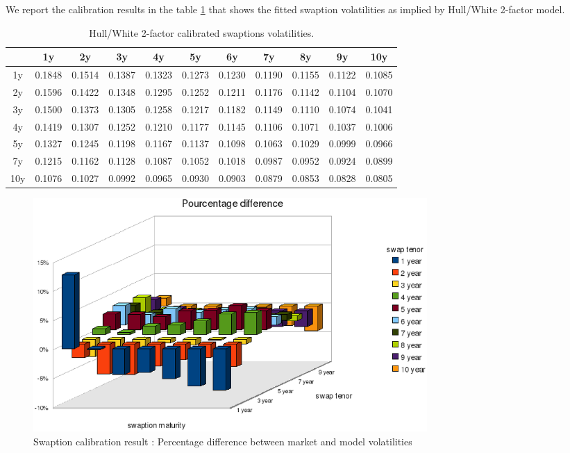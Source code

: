 \documentclass[12pt,a4paper]{article}
\begin{document}
We report the calibration results in the table \ref{''swaption res 1''} that shows the fitted swaption volatilities as implied by Hull/White 2-factor model.
\begin{table}[''h'']
   \centering
    \begin{tabular}{|c|c|c|c|c|c|c|c|c|c|c|}
    \hline
       & 1y & 2y & 3y & 4y & 5y & 6y & 7y & 8y & 9y & 10y\\
    \hline
1y & 0.1848 & 0.1514 & 0.1387 & 0.1323 & 0.1273 & 0.1230 & 0.1190 & 0.1155 & 0.1122 & 0.1085 \\
2y & 0.1596 & 0.1422 & 0.1348 & 0.1295 & 0.1252 & 0.1211 & 0.1176 & 0.1142 & 0.1104 & 0.1070 \\
3y & 0.1500 & 0.1373 & 0.1305 & 0.1258 & 0.1217 & 0.1182 & 0.1149 & 0.1110 & 0.1074 & 0.1041 \\
4y & 0.1419 & 0.1307 & 0.1252 & 0.1210 & 0.1177 & 0.1145 & 0.1106 & 0.1071 & 0.1037 & 0.1006 \\
5y & 0.1327 & 0.1245 & 0.1198 & 0.1167 & 0.1137 & 0.1098 & 0.1063 & 0.1029 & 0.0999 & 0.0966 \\
7y & 0.1215 & 0.1162 & 0.1128 & 0.1087 & 0.1052 & 0.1018 & 0.0987 & 0.0952 & 0.0924 & 0.0899 \\
10y & 0.1076 & 0.1027 & 0.0992 & 0.0965 & 0.0930 & 0.0903 & 0.0879 & 0.0853 & 0.0828 & 0.0805 \\
    \hline
\end{tabular}
\caption{\label{''swaption res 1''} Hull/White 2-factor calibrated swaptions volatilities. }
\end{table}

\begin{figure}[h!]
 \centering
 \includegraphics[width=15cm,bb=0 0 791 510,keepaspectratio=true]{swaption.eps}
 \caption{Swaption calibration result : Percentage difference between market and model volatilities}
 \label{fig:swaption_vol}
\end{figure}
\end{document}
